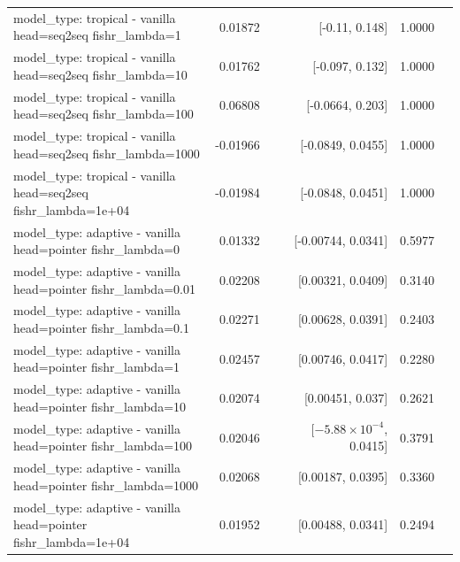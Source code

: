 \documentclass[10pt]{article}
\makeatletter
\newcommand{\stackcell}[1]{\begin{tabular}[t]{@{}l@{}}#1\end{tabular}}
\makeatother
\begin{document}
{\begin{longtable}{lrrrl}
\stackcell{model\_type: tropical - vanilla\\\footnotesize head=seq2seq fishr\_lambda=1 } & 0.01872 & [-0.11, 0.148] & 1.0000 & \\
\stackcell{model\_type: tropical - vanilla\\\footnotesize head=seq2seq fishr\_lambda=10 } & 0.01762 & [-0.097, 0.132] & 1.0000 & \\
\stackcell{model\_type: tropical - vanilla\\\footnotesize head=seq2seq fishr\_lambda=100 } & 0.06808 & [-0.0664, 0.203] & 1.0000 & \\
\stackcell{model\_type: tropical - vanilla\\\footnotesize head=seq2seq fishr\_lambda=1000 } & -0.01966 & [-0.0849, 0.0455] & 1.0000 & \\
\stackcell{model\_type: tropical - vanilla\\\footnotesize head=seq2seq fishr\_lambda=1e+04 } & -0.01984 & [-0.0848, 0.0451] & 1.0000 & \\
\stackcell{model\_type: adaptive - vanilla\\\footnotesize head=pointer fishr\_lambda=0 } & 0.01332 & [-0.00744, 0.0341] & 0.5977 & \\
\stackcell{model\_type: adaptive - vanilla\\\footnotesize head=pointer fishr\_lambda=0.01 } & 0.02208 & [0.00321, 0.0409] & 0.3140 & \\
\stackcell{model\_type: adaptive - vanilla\\\footnotesize head=pointer fishr\_lambda=0.1 } & 0.02271 & [0.00628, 0.0391] & 0.2403 & \\
\stackcell{model\_type: adaptive - vanilla\\\footnotesize head=pointer fishr\_lambda=1 } & 0.02457 & [0.00746, 0.0417] & 0.2280 & \\
\stackcell{model\_type: adaptive - vanilla\\\footnotesize head=pointer fishr\_lambda=10 } & 0.02074 & [0.00451, 0.037] & 0.2621 & \\
\stackcell{model\_type: adaptive - vanilla\\\footnotesize head=pointer fishr\_lambda=100 } & 0.02046 & [$-5.88\times10^{-4}$, 0.0415] & 0.3791 & \\
\stackcell{model\_type: adaptive - vanilla\\\footnotesize head=pointer fishr\_lambda=1000 } & 0.02068 & [0.00187, 0.0395] & 0.3360 & \\
\stackcell{model\_type: adaptive - vanilla\\\footnotesize head=pointer fishr\_lambda=1e+04 } & 0.01952 & [0.00488, 0.0341] & 0.2494 & \\

\end{longtable}}
\end{document}
